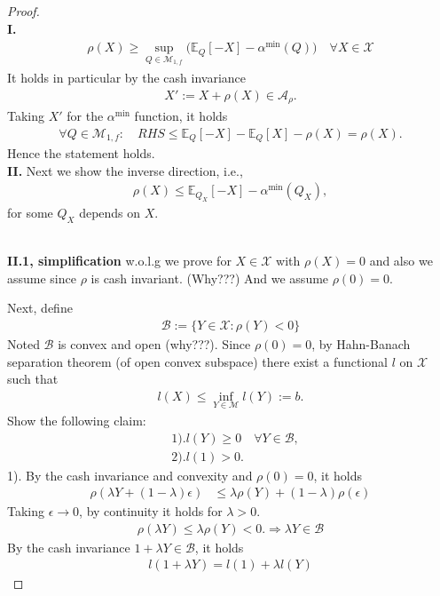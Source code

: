 \documentclass[a4paper,11pt]{book}
\theoremstyle{definition}
\theoremstyle{remark}
\begin{document}
\begin{proof}
\quad\\
\textbf{I.} 
\begin{align*}
	\rho(X) \ge \sup_{Q \in \mathcal{M}_{1, f}} \bigg( \mathbb{E}_Q[-X] - \alpha^{\min} (Q) \bigg)\quad \forall X \in \mathcal{X}
\end{align*}
It holds in particular by the cash invariance
\begin{align*}
	X':= X + \rho(X) \in \mathcal{A}_\rho.
\end{align*}
Taking $X'$ for the $\alpha^{\min}$ function, it holds
\begin{align*}
	\forall Q \in \mathcal{M}_{1, f}: \quad RHS \le  \mathbb{E}_Q[-X] - \mathbb{E}_Q[X] - \rho(X) = \rho(X).
\end{align*}
Hence the statement holds.
\quad\\
\textbf{II.} Next we show the inverse direction, i.e., 
\begin{align*}
	\rho(X) \le \mathbb{E}_{Q_X}[-X] - \alpha^{\min}(Q_X),
\end{align*}
for some $Q_X$ depends on $X$.

\quad\\
\textbf{II.1, simplification} w.o.l.g we prove for $X \in \mathcal{X}$ with $\rho(X) = 0$ and also we assume since $\rho$ is cash invariant. (Why???) And we assume $\rho(0) = 0$. \par 
\quad\par 
Next, define 
\begin{align*}
	\mathcal{B}:= \{ Y \in \mathcal{X}: \rho(Y) < 0\}
\end{align*}
Noted $\mathcal{B}$ is convex and open (why???). Since $\rho(0) = 0$, by Hahn-Banach separation theorem (of open convex subspace) there exist a functional $l$ on $\mathcal{X}$ such that
\begin{align*}
	l(X) \le \inf_{Y \in \mathcal{M}} l(Y):= b. 
\end{align*}
Show the following claim:
\begin{align*}
	& 1). l(Y) \ge 0 \quad \forall Y \in \mathcal{B},\\
	& 2). l(1) > 0. 
\end{align*}
1). By the cash invariance and convexity and $\rho(0) = 0$, it holds
\begin{align*}
	\rho(\lambda Y + (1 - \lambda) \epsilon) & \le \lambda \rho (Y) + ( 1 - \lambda ) \rho(\epsilon) 
\end{align*}
Taking $\epsilon \rightarrow 0$, by continuity it holds for $\lambda > 0$. 
\begin{align*}
	\rho (\lambda Y) \le \lambda \rho(Y) < 0. \Rightarrow \lambda Y \in \mathcal{B}
\end{align*}
By the cash invariance $ 1 + \lambda Y \in \mathcal{B}$, it holds
\begin{align*}
	l( 1 + \lambda Y) = l(1) + \lambda l(Y)
\end{align*}



\end{proof}
\end{document}
